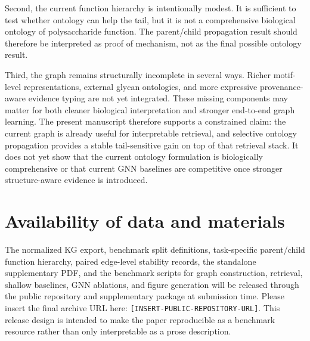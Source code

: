 \documentclass[11pt]{article}
\begin{document}
Second, the current function hierarchy is intentionally modest. It is sufficient to test whether ontology can help the tail, but it is not a comprehensive biological ontology of polysaccharide function. The parent/child propagation result should therefore be interpreted as proof of mechanism, not as the final possible ontology result.

Third, the graph remains structurally incomplete in several ways. Richer motif-level representations, external glycan ontologies, and more expressive provenance-aware evidence typing are not yet integrated. These missing components may matter for both cleaner biological interpretation and stronger end-to-end graph learning. The present manuscript therefore supports a constrained claim: the current graph is already useful for interpretable retrieval, and selective ontology propagation provides a stable tail-sensitive gain on top of that retrieval stack. It does not yet show that the current ontology formulation is biologically comprehensive or that current GNN baselines are competitive once stronger structure-aware evidence is introduced.

\section{Availability of data and materials}
\label{sec:artifact-availability}

The normalized KG export, benchmark split definitions, task-specific parent/child function hierarchy, paired edge-level stability records, the standalone supplementary PDF, and the benchmark scripts for graph construction, retrieval, shallow baselines, GNN ablations, and figure generation will be released through the public repository and supplementary package at submission time. Please insert the final archive URL here: \texttt{[INSERT-PUBLIC-REPOSITORY-URL]}. This release design is intended to make the paper reproducible as a benchmark resource rather than only interpretable as a prose description.
\end{document}
